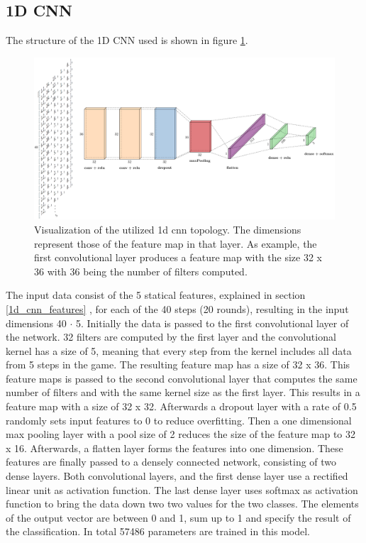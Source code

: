 

\newpage

\subsection{1D CNN}
\label{1d_cnn}
The structure of the 1D CNN used is shown in figure \ref{fig:1dCnnStructure}.
\begin{figure}[H]
	\centering
	\includegraphics[width=15cm]{images/1dCnnStructureChanged.png}
	\caption[Bild kurz]{Visualization of the utilized 1d cnn topology. The dimensions represent those of the feature map in that layer. As example, the first convolutional layer produces a feature map with the size 32 x 36 with 36 being the number of filters computed.}
	\label{fig:1dCnnStructure}
\end{figure}
The input data consist of the 5 statical features, explained in section \ref{1d_cnn_features} , for each of the 40 steps (20 rounds), resulting in the input dimensions 40 $\cdot$ 5. Initially the data is passed to the first convolutional layer of the network. 32 filters are computed by the first layer and the convolutional kernel has a size of 5, meaning that every step from the kernel includes all data from 5 steps in the game. The resulting feature map has a size of 32 x 36. This feature maps is passed to the second convolutional layer that computes the same number of filters and with the same kernel size as the first layer. This results in a feature map with a size of 32 x 32. Afterwards a dropout layer with a rate of 0.5 randomly sets input features to 0 to reduce overfitting. Then a one dimensional max pooling layer with a pool size of 2 reduces the size of the feature map to 32 x 16. Afterwards, a flatten layer forms the features into one dimension. These features are finally passed to a densely connected network, consisting of two dense layers. Both convolutional layers, and the first dense layer use a rectified linear unit as activation function. The last dense layer uses softmax as activation function to bring the data down two two values for the two classes. The elements of the output vector are between 0 and 1, sum up to 1 and specify the result of the classification. In total 57486 parameters are trained in this model. 

